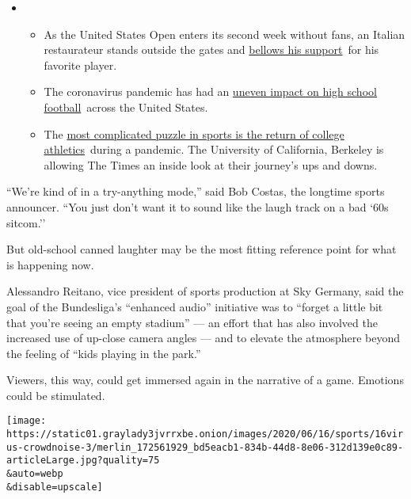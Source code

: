 \begin{itemize}
\item
  \begin{itemize}
  \tightlist
  \item
    As the United States Open enters its second week without fans, an
    Italian restaurateur stands outside the gates and
    \href{https://www.nytimes3xbfgragh.onion/2020/09/06/sports/tennis/US-Open-Matteo-Berrettini-fan.html?action=click\&pgtype=Article\&state=default\&region=MAIN_CONTENT_2\&context=storylines_keepup}{bellows
    his support}~for his favorite player.
  \item
    The coronavirus pandemic has had an
    \href{https://www.nytimes3xbfgragh.onion/2020/09/03/sports/ncaafootball/high-school-football-coronavirus-pandemic.html?action=click\&pgtype=Article\&state=default\&region=MAIN_CONTENT_2\&context=storylines_keepup}{uneven
    impact on high school football}~across the United States.
  \item
    The
    \href{https://www.nytimes3xbfgragh.onion/2020/09/02/sports/ncaafootball/coronavirus-cal-athletics-season.html?action=click\&pgtype=Article\&state=default\&region=MAIN_CONTENT_2\&context=storylines_keepup}{most
    complicated puzzle in sports is the return of college
    athletics}~during a pandemic. The University of California, Berkeley
    is allowing The Times an inside look at their journey's ups and
    downs.
  \end{itemize}
\end{itemize}

``We're kind of in a try-anything mode,'' said Bob Costas, the longtime
sports announcer. ``You just don't want it to sound like the laugh track
on a bad `60s sitcom.''

But old-school canned laughter may be the most fitting reference point
for what is happening now.

Alessandro Reitano, vice president of sports production at Sky Germany,
said the goal of the Bundesliga's ``enhanced audio'' initiative was to
``forget a little bit that you're seeing an empty stadium'' --- an
effort that has also involved the increased use of up-close camera
angles --- and to elevate the atmosphere beyond the feeling of ``kids
playing in the park.''

Viewers, this way, could get immersed again in the narrative of a game.
Emotions could be stimulated.

\texttt{[image: https://static01.graylady3jvrrxbe.onion/images/2020/06/16/sports/16virus-crowdnoise-3/merlin\_172561929\_bd5eacb1-834b-44d8-8e06-312d139e0c89-articleLarge.jpg?quality=75\\\&auto=webp\\\&disable=upscale]}

